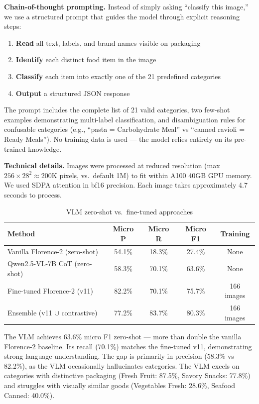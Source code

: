 \documentclass[11pt]{article}
\begin{document}
\textbf{Chain-of-thought prompting.} Instead of simply asking ``classify this image,'' we use a structured prompt that guides the model through explicit reasoning steps:
\begin{enumerate}[nosep,leftmargin=1.5em]
  \item \textbf{Read} all text, labels, and brand names visible on packaging
  \item \textbf{Identify} each distinct food item in the image
  \item \textbf{Classify} each item into exactly one of the 21 predefined categories
  \item \textbf{Output} a structured JSON response
\end{enumerate}
The prompt includes the complete list of 21 valid categories, two few-shot examples demonstrating multi-label classification, and disambiguation rules for confusable categories (e.g., ``pasta = Carbohydrate Meal'' vs ``canned ravioli = Ready Meals''). No training data is used --- the model relies entirely on its pre-trained knowledge.

\textbf{Technical details.} Images were processed at reduced resolution (max $256 \times 28^2 \approx 200$K pixels, vs.\ default 1M) to fit within A100 40GB GPU memory. We used SDPA attention in bf16 precision. Each image takes approximately 4.7 seconds to process.

\begin{table}[h]
\centering
\caption{VLM zero-shot vs.\ fine-tuned approaches}
\label{tab:vlm}
\begin{tabular}{lcccc}
\toprule
Method & Micro P & Micro R & Micro F1 & Training \\
\midrule
Vanilla Florence-2 (zero-shot) & 54.1\% & 18.3\% & 27.4\% & None \\
Qwen2.5-VL-7B CoT (zero-shot) & 58.3\% & 70.1\% & 63.6\% & None \\
Fine-tuned Florence-2 (v11) & 82.2\% & 70.1\% & 75.7\% & 166 images \\
Ensemble (v11 $\cup$ contrastive) & 77.2\% & 83.7\% & 80.3\% & 166 images \\
\bottomrule
\end{tabular}
\end{table}

The VLM achieves 63.6\% micro F1 zero-shot --- more than double the vanilla Florence-2 baseline. Its recall (70.1\%) matches the fine-tuned v11, demonstrating strong language understanding. The gap is primarily in precision (58.3\% vs 82.2\%), as the VLM occasionally hallucinates categories. The VLM excels on categories with distinctive packaging (Fresh Fruit: 87.5\%, Savory Snacks: 77.8\%) and struggles with visually similar goods (Vegetables Fresh: 28.6\%, Seafood Canned: 40.0\%).
\end{document}
